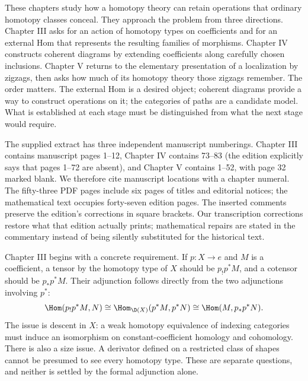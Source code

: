 These chapters study how a homotopy theory can retain operations that
ordinary homotopy classes conceal. They approach the problem from three directions.
Chapter III asks for an action of homotopy types on coefficients and for an
external Hom that represents the resulting families of morphisms. Chapter IV
constructs coherent diagrams by extending coefficients along carefully chosen
inclusions. Chapter V returns to the elementary presentation of a localization
by zigzags, then asks how much of its homotopy theory those zigzags remember.
The order matters. The external Hom is a desired object; coherent diagrams
provide a way to construct operations on it; the categories of paths are a
candidate model. What is established at each stage must be distinguished from
what the next stage would require.

The supplied extract has three independent manuscript numberings. Chapter III
contains manuscript pages 1--12, Chapter IV contains 73--83 (the edition
explicitly says that pages 1--72 are absent), and Chapter V contains 1--52,
with page 32 marked blank. We therefore cite manuscript locations with a
chapter numeral. The fifty-three PDF pages include six pages of titles and
editorial notices; the mathematical text occupies forty-seven edition pages.
The inserted comments preserve the edition's corrections in square brackets.
Our transcription corrections restore what that edition actually prints;
mathematical repairs are stated in the commentary instead of being silently
substituted for the historical text.

Chapter III begins with a concrete requirement. If $p:X\to e$ and $M$ is a
coefficient, a tensor by the homotopy type of $X$ should be $p_!p^*M$, and a
cotensor should be $p_*p^*M$. Their adjunction follows directly from the two
adjunctions involving $p^*$:
\[
 \Hom(p_!p^*M,N)\cong\Hom_{\D(X)}(p^*M,p^*N)
 \cong\Hom(M,p_*p^*N).
\]
The issue is descent in $X$: a weak homotopy equivalence of indexing categories
must induce an isomorphism on constant-coefficient homology and cohomology.
There is also a size issue. A derivator defined on a restricted class of
shapes cannot be presumed to see every homotopy type. These are separate
questions, and neither is settled by the formal adjunction alone.


